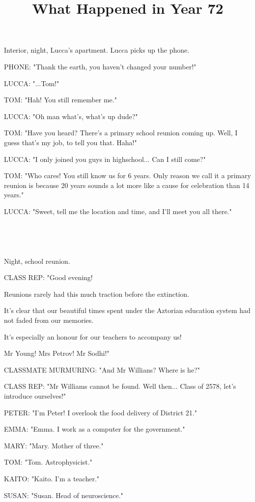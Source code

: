 \documentclass[11pt]{article}
\begin{document}
\ttfamily
\title{What Happened in Year 72}
\maketitle

Interior, night, Lucca's apartment.
Lucca picks up the phone. 

PHONE: "Thank the earth, you haven't changed your number!"

LUCCA: "...Tom!"

TOM: "Hah! You still remember me."

LUCCA: "Oh man what's, what's up dude?"

TOM: "Have you heard? 
There's a primary school reunion coming up.
Well, I guess that's my job, to tell you that. 
Haha!"

LUCCA: "I only joined you guys in highschool...
Can I still come?"

TOM: "Who cares!
You still know us for 6 years. 
Only reason we call it a primary reunion is because 20 years sounds a lot more like a cause for celebration than 14 years."

LUCCA: "Sweet, tell me the location and time, and I'll meet you all there."

\ 

\ 

Night, school reunion.

CLASS REP: "Good evening!

Reunions rarely had this much traction before the extinction.

It's clear that our beautiful times spent under the Aztorian education system had not faded from our memories.

It's especially an honour for our teachers to accompany us!

Mr Young!
Mrs Petrov!
Mr Sodhi!"

CLASSMATE MURMURING: "And Mr Willians? Where is he?"

CLASS REP: "Mr Williams cannot be found. Well then...
Class of 2578, let's introduce ourselves!"

PETER: "I'm Peter! I overlook the food delivery of District 21."

EMMA: "Emma. I work as a computer for the government."

MARY: "Mary. Mother of three."

TOM: "Tom. Astrophysicist."

KAITO: "Kaito. I'm a teacher."

SUSAN: "Susan. Head of neuroscience."
\end{document}
